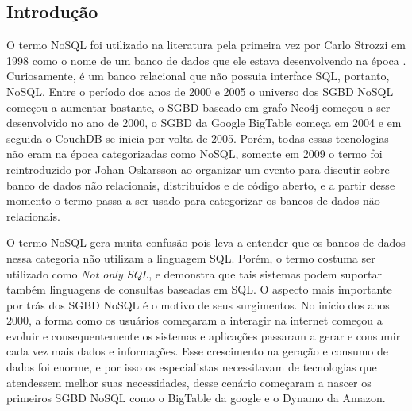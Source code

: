\subsection{Introdução}
	O termo NoSQL foi utilizado na literatura pela primeira vez por Carlo Strozzi em 1998 como o nome de um banco de dados que ele estava desenvolvendo na época \cite{FirstNoSQL}. Curiosamente, é um banco relacional que não possuia interface SQL, portanto, NoSQL. Entre o período dos anos de 2000 e 2005 o universo dos SGBD NoSQL começou a aumentar bastante, o SGBD baseado em grafo Neo4j começou a ser desenvolvido no ano de 2000, o SGBD da Google BigTable\cite{Chang:2008:BDS:1365815.1365816} começa em 2004 e em seguida o CouchDB se inicia por volta de 2005. Porém, todas essas tecnologias não eram na época categorizadas como NoSQL, somente em 2009 o termo foi reintroduzido por Johan Oskarsson ao organizar um evento para discutir sobre banco de dados não relacionais, distribuídos e de código aberto, e a partir desse momento o termo passa a ser usado para categorizar os bancos de dados não relacionais.
	
	O termo NoSQL gera muita confusão pois leva a entender que os bancos de dados nessa categoria não utilizam a linguagem SQL. Porém, o termo costuma ser utilizado como \textit{Not only SQL}, e demonstra que tais sistemas podem suportar também linguagens de consultas baseadas em SQL. O aspecto mais importante por trás dos SGBD NoSQL é o motivo de seus surgimentos. No início dos anos 2000, a forma como os usuários começaram a interagir na internet começou a evoluir e consequentemente os sistemas e aplicações passaram a gerar e consumir cada vez mais dados e informações. Esse crescimento na geração e consumo de dados foi enorme, e por isso os especialistas necessitavam de tecnologias que atendessem melhor suas necessidades, desse cenário começaram a nascer os primeiros SGBD NoSQL como o BigTable da google e o Dynamo da Amazon\cite{DeCandia:2007:DAH:1323293.1294281}.
	
